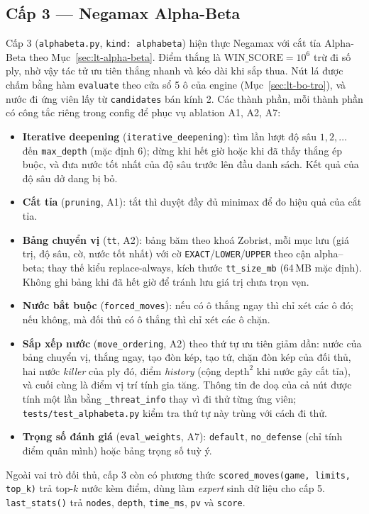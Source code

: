 \subsection{Cấp 3 --- Negamax Alpha-Beta}
Cấp 3 (\texttt{alphabeta.py}, \texttt{kind: alphabeta}) hiện thực Negamax với cắt tỉa Alpha-Beta theo Mục~\ref{sec:lt-alpha-beta}. Điểm thắng là $\text{WIN\_SCORE}=10^6$ trừ đi số ply, nhờ vậy tác tử ưu tiên thắng nhanh và kéo dài khi sắp thua. Nút lá được chấm bằng hàm \texttt{evaluate} theo cửa sổ 5 ô của engine (Mục~\ref{sec:lt-bo-tro}), và nước đi ứng viên lấy từ \texttt{candidates} bán kính 2. Các thành phần, mỗi thành phần có công tắc riêng trong config để phục vụ ablation A1, A2, A7:
\begin{itemize}
  \item \textbf{Iterative deepening} (\texttt{iterative\_deepening}): tìm lần lượt độ sâu $1,2,\dots$ đến \texttt{max\_depth} (mặc định 6); dừng khi hết giờ hoặc khi đã thấy thắng ép buộc, và đưa nước tốt nhất của độ sâu trước lên đầu danh sách. Kết quả của độ sâu dở dang bị bỏ.
  \item \textbf{Cắt tỉa} (\texttt{pruning}, A1): tắt thì duyệt đầy đủ minimax để đo hiệu quả của cắt tỉa.
  \item \textbf{Bảng chuyển vị} (\texttt{tt}, A2): bảng băm theo khoá Zobrist, mỗi mục lưu (giá trị, độ sâu, cờ, nước tốt nhất) với cờ \texttt{EXACT}/\texttt{LOWER}/\texttt{UPPER} theo cận alpha--beta; thay thế kiểu replace-always, kích thước \texttt{tt\_size\_mb} (64\,MB mặc định). Không ghi bảng khi đã hết giờ để tránh lưu giá trị chưa trọn vẹn.
  \item \textbf{Nước bắt buộc} (\texttt{forced\_moves}): nếu có ô thắng ngay thì chỉ xét các ô đó; nếu không, mà đối thủ có ô thắng thì chỉ xét các ô chặn.
  \item \textbf{Sắp xếp nước} (\texttt{move\_ordering}, A2) theo thứ tự ưu tiên giảm dần: nước của bảng chuyển vị, thắng ngay, tạo đòn kép, tạo tứ, chặn đòn kép của đối thủ, hai nước \emph{killer} của ply đó, điểm \emph{history} (cộng $\text{depth}^2$ khi nước gây cắt tỉa), và cuối cùng là điểm vị trí tính gia tăng. Thông tin đe doạ của cả nút được tính một lần bằng \texttt{\_threat\_info} thay vì đi thử từng ứng viên; \texttt{tests/test\_alphabeta.py} kiểm tra thứ tự này trùng với cách đi thử.
  \item \textbf{Trọng số đánh giá} (\texttt{eval\_weights}, A7): \texttt{default}, \texttt{no\_defense} (chỉ tính điểm quân mình) hoặc bảng trọng số tuỳ ý.
\end{itemize}
Ngoài vai trò đối thủ, cấp 3 còn có phương thức \texttt{scored\_moves(game, limits, top\_k)} trả top-$k$ nước kèm điểm, dùng làm \emph{expert} sinh dữ liệu cho cấp 5. \texttt{last\_stats()} trả \texttt{nodes}, \texttt{depth}, \texttt{time\_ms}, \texttt{pv} và \texttt{score}.
